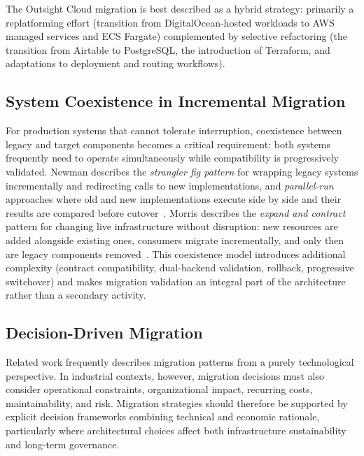 The Outsight Cloud migration is best described as a hybrid strategy: primarily a replatforming effort (transition from DigitalOcean-hosted workloads to AWS managed services and ECS Fargate) complemented by selective refactoring (the transition from Airtable to PostgreSQL, the introduction of Terraform, and adaptations to deployment and routing workflows).

\subsection{System Coexistence in Incremental Migration}
For production systems that cannot tolerate interruption, coexistence between legacy and target components becomes a critical requirement: both systems frequently need to operate simultaneously while compatibility is progressively validated. Newman describes the \emph{strangler fig pattern} for wrapping legacy systems incrementally and redirecting calls to new implementations, and \emph{parallel-run} approaches where old and new implementations execute side by side and their results are compared before cutover~\cite{newman2021building}. Morris describes the \emph{expand and contract} pattern for changing live infrastructure without disruption: new resources are added alongside existing ones, consumers migrate incrementally, and only then are legacy components removed~\cite{morris2021iac}. This coexistence model introduces additional complexity (contract compatibility, dual-backend validation, rollback, progressive switchover) and makes migration validation an integral part of the architecture rather than a secondary activity.

\subsection{Decision-Driven Migration}
Related work frequently describes migration patterns from a purely technological perspective. In industrial contexts, however, migration decisions must also consider operational constraints, organizational impact, recurring costs, maintainability, and risk. Migration strategies should therefore be supported by explicit decision frameworks combining technical and economic rationale, particularly where architectural choices affect both infrastructure sustainability and long-term governance.

